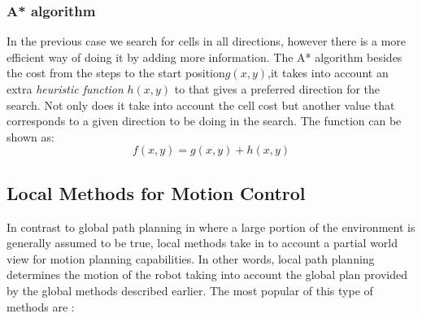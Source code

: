 \subsubsection{A* algorithm}\label{A*}
In the previous case we search for cells in all directions, however there is a more efficient way of doing it by adding more information. The A* algorithm besides the cost from the steps to the start position$g(x,y)$,it takes into account an extra \textit{heuristic function} $h(x, y)$ to that gives a preferred direction for the search. Not only does it take into account the cell cost but another value that corresponds to a given direction to be doing in  the search. The function can be shown as:
\begin{equation}
    f(x,y)=g(x,y) + h(x,y)
\end{equation}
\subsection{Local Methods for Motion Control }
In contrast to global path planning in where a large portion of the environment is generally assumed to be true, local methods take in to account a partial world view for motion planning capabilities. In other words, local path planning determines the motion of the robot taking into account the global plan provided by the global methods described earlier.
The most popular of this type of methods are \cite{inbookdwa}:
